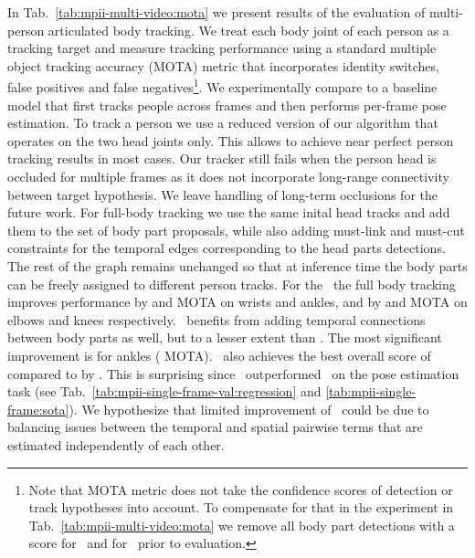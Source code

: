  In Tab.~\ref{tab:mpii-multi-video:mota} we present results of the
evaluation of multi-person articulated body tracking. We treat each body joint of each person as a
tracking target and measure tracking performance using a standard multiple object tracking accuracy
(MOTA) metric \cite{Bernardin:2008:CLE} that incorporates identity switches, false positives and
false negatives\footnote{Note that MOTA metric does not take the confidence scores of detection or
  track hypotheses into account. To compensate for that in the experiment in
  Tab.~\ref{tab:mpii-multi-video:mota} we remove all body part detections with a score 
   for \busparse~and  for \tdbushort~prior to evaluation.}. We experimentally compare to a baseline model that first tracks people
across frames and then performs per-frame pose estimation.
To track a person we use a reduced version of our algorithm that operates on the two head
joints only. This allows to achieve near perfect person tracking results in most cases. Our tracker still fails
when the person head is occluded for multiple frames as it does not incorporate long-range
connectivity between target hypothesis. We leave handling of long-term occlusions for the future
work.
For full-body tracking we use the same inital head tracks and add them to the set of body part
proposals, while also adding must-link and must-cut constraints for the temporal edges corresponding
to the head parts detections.
The rest of the graph remains unchanged so that at inference time the body parts can be freely
assigned to different person tracks. For the \busparse{}~the full body tracking improves performance
by  and  MOTA on wrists and ankles, and by  and  MOTA on elbows and knees
respectively. \tdbushort~benefits from adding temporal connections between body parts as well, but
to a lesser extent than \busparse{}. The most significant improvement is for ankles (
MOTA). \busparse{}~also achieves the best overall score of  compared to  by \tdbushort.
 This is surprising since \tdbushort~outperformed \busparse~on the pose
estimation task (see Tab.~\ref{tab:mpii-single-frame-val:regression} and
\ref{tab:mpii-single-frame:sota}). We hypothesize that limited improvement of \tdbushort~could be
due to balancing issues between the temporal and spatial pairwise terms that are estimated
independently of each other.
\tabcolsep 1.5pt
